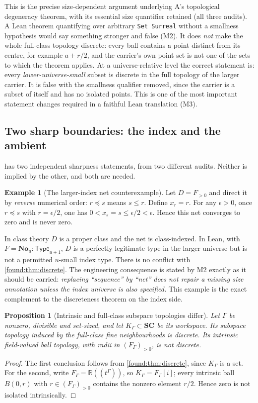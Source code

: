 \documentclass[11pt,letterpaper]{article}
\numberwithin{equation}{section}
\newtheorem{proposition}[theorem]{Proposition}
\theoremstyle{definition}
\newtheorem{example}[theorem]{Example}
\theoremstyle{remark}
\newcommand{\No}{\mathbf{No}}
\newcommand{\SC}{\mathbf{SC}}
\newcommand{\R}{\mathbb R}
\newcommand{\Type}{\mathsf{Type}}
\begin{document}
This is the precise size-dependent argument underlying A's topological
degeneracy theorem, with its essential size quantifier retained (all three
audits). A Lean theorem quantifying over arbitrary \texttt{Set Surreal} without
a smallness hypothesis would say something stronger and false (M2). It does
\emph{not} make the whole full-class topology discrete: every ball contains a
point distinct from its centre, for example $a+r/2$, and the carrier's own point
set is not one of the sets to which the theorem applies. At a universe-relative
level the correct statement is: every \emph{lower-universe-small} subset is
discrete in the full topology of the larger carrier. It is false with the
smallness qualifier removed, since the carrier is a subset of itself and has no
isolated points. This is one of the most important statement changes required in
a faithful Lean translation (M3).

\subsection{Two sharp boundaries: the index and the ambient}
\label{found:sub:boundaries}
 has two independent sharpness statements, from two
different audits. Neither is implied by the other, and both are needed.

\begin{example}[The larger-index net counterexample]\label{found:ex:largerindex}
Let $D=F_{>0}$ and direct it by \emph{reverse} numerical order: $r\preceq s$
means $s\le r$. Define $x_r=r$. For any $\epsilon>0$, once $r\preceq s$ with
$r=\epsilon/2$, one has $0<x_s=s\le\epsilon/2<\epsilon$. Hence this net
converges to zero and is never zero.
\end{example}

In class theory $D$ is a proper class and the net is class-indexed. In Lean,
with $F=\No_u:\Type_{u+1}$, $D$ is a perfectly legitimate type in the larger
universe but is not a permitted $u$-small index type. There is no conflict with
\cref{found:thm:discrete}. The engineering consequence is stated by M2 exactly
as it should be carried: \emph{replacing ``sequence'' by ``net'' does not repair
a missing size annotation unless the index universe is also specified.} This
example is the exact complement to the discreteness theorem on the index side.

\begin{proposition}[Intrinsic and full-class subspace topologies differ]\label{found:prop:twotopologies}
Let $\Gamma$ be nonzero, divisible and set-sized, and let
$K_\Gamma\subset\SC$ be its workspace. Its subspace topology induced by the
full-class fine neighbourhoods is discrete. Its intrinsic field-valued ball
topology, with radii in $(F_\Gamma)_{>0}$, is not discrete.
\end{proposition}
\begin{proof}
The first conclusion follows from \cref{found:thm:discrete}, since $K_\Gamma$ is
a set. For the second, write $F_\Gamma=\R((t^\Gamma))$, so
$K_\Gamma=F_\Gamma[i]$; every intrinsic ball $B(0,r)$ with
$r\in(F_\Gamma)_{>0}$ contains the nonzero element $r/2$. Hence zero is not
isolated intrinsically.
\end{proof}
\end{document}
